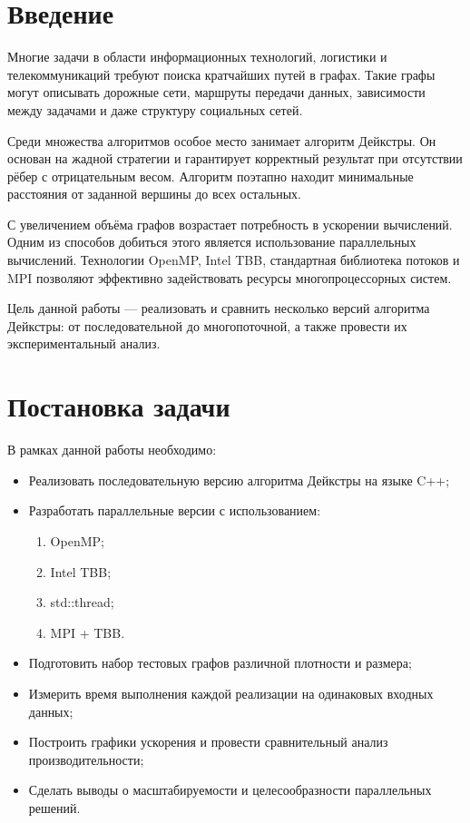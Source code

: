 \documentclass[12pt,a4paper]{extarticle}
\begin{document}
\tableofcontents
\newpage

\section{Введение}

Многие задачи в области информационных технологий, логистики и телекоммуникаций требуют
поиска кратчайших путей в графах. Такие графы могут описывать дорожные сети, маршруты
передачи данных, зависимости между задачами и даже структуру социальных сетей.

Среди множества алгоритмов особое место занимает алгоритм Дейкстры. Он основан на жадной
стратегии и гарантирует корректный результат при отсутствии рёбер с отрицательным весом.
Алгоритм поэтапно находит минимальные расстояния от заданной вершины до всех остальных.

С увеличением объёма графов возрастает потребность в ускорении вычислений. Одним из
способов добиться этого является использование параллельных вычислений. Технологии OpenMP,
Intel TBB, стандартная библиотека потоков и MPI позволяют эффективно задействовать
ресурсы многопроцессорных систем.

Цель данной работы — реализовать и сравнить несколько версий алгоритма Дейкстры: от
последовательной до многопоточной, а также провести их экспериментальный анализ.

\section*{Постановка задачи}

В рамках данной работы необходимо:

\begin{itemize}
    \item Реализовать последовательную версию алгоритма Дейкстры на языке C++;
    \item Разработать параллельные версии с использованием:
    \begin{enumerate}
        \item OpenMP;
        \item Intel TBB;
        \item std::thread;
        \item MPI + TBB.
    \end{enumerate}
    \item Подготовить набор тестовых графов различной плотности и размера;
    \item Измерить время выполнения каждой реализации на одинаковых входных данных;
    \item Построить графики ускорения и провести сравнительный анализ производительности;
    \item Сделать выводы о масштабируемости и целесообразности параллельных решений.
\end{itemize}
\end{document}
